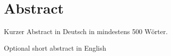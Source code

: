 \section*{Abstract}

Kurzer Abstract in Deutsch in mindestens 500 Wörter.

Optional short abstract in English
